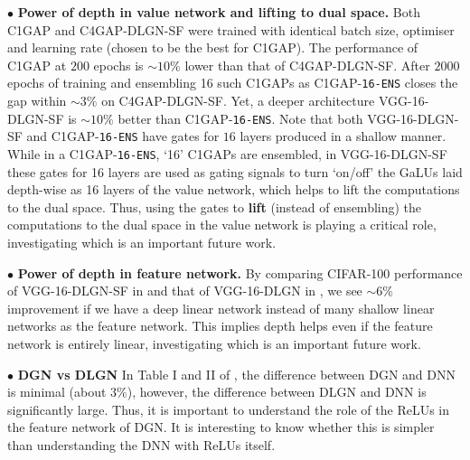 $\bullet$ \textbf{Power of depth in value network and lifting to dual space.} Both C1GAP and C4GAP-DLGN-SF were trained with identical batch size, optimiser and learning rate (chosen to be the best for C1GAP). The performance of C1GAP at $200$ epochs is $\sim10\%$ lower than that of C4GAP-DLGN-SF. After $2000$ epochs of training and ensembling 16 such C1GAPs as C1GAP-\texttt{16-ENS} closes the gap within $\sim 3\%$ on C4GAP-DLGN-SF. Yet, a deeper architecture VGG-16-DLGN-SF is $\sim10\%$ better than C1GAP-\texttt{16-ENS}.  Note that both VGG-16-DLGN-SF and C1GAP-\texttt{16-ENS} have gates for $16$ layers produced in a shallow manner. While in a C1GAP-\texttt{16-ENS}, `16' C1GAPs are ensembled, in VGG-16-DLGN-SF these gates for 16 layers are used as gating signals to turn `on/off' the GaLUs laid depth-wise as 16 layers of the value network, which helps to lift the computations to the dual space. Thus, using the gates to \textbf{lift} (instead of ensembling) the computations to the dual space in the value network is playing a critical role, investigating which is an important future work.%

$\bullet$ \textbf{Power of depth in feature network.} By comparing CIFAR-100 performance of VGG-16-DLGN-SF in  and that of VGG-16-DLGN in , we see $\sim 6\%$ improvement if we have a deep linear network instead of many shallow linear networks as the feature network. This implies depth helps even if the feature network is entirely linear, investigating which is an important future work. 

$\bullet$ \textbf{DGN vs DLGN} In Table I and II of , the difference between DGN and DNN is minimal (about $3\%$), however, the difference between DLGN and DNN is significantly large. Thus, it is important to understand the role of the ReLUs in the feature network of DGN. It is interesting to know whether this is simpler than understanding the DNN with ReLUs itself.

